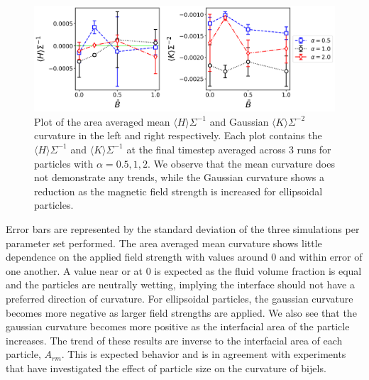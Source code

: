 \begin{figure} 
    \centering 
    \includegraphics[scale = 0.4]{figures/results/paper1/curvature-vs-B_ss.png} 
    \caption{Plot of the area averaged mean $\langle H \rangle \Sigma^{-1}$ and Gaussian 
            $\langle K \rangle \Sigma^{-2}$ curvature in the left and right respectively. Each 
            plot contains the $\langle H \rangle \Sigma^{-1}$ and $\langle K \rangle \Sigma^{-1}$ 
            at the final timestep averaged across 3 runs for particles with $\alpha = 0.5, 1, 2$. 
            We observe that the mean curvature does not demonstrate any trends, while the Gaussian 
            curvature shows a reduction as the magnetic field strength is increased for 
            ellipsoidal particles.} 
    \label{fig:curvature-vs-B_ss}
\end{figure}

Error bars are represented by the standard
deviation of the three simulations per parameter set performed. The area
averaged mean curvature shows little dependence on the applied field
strength with values around 0 and within error of one another. A value
near or at 0 is expected as the fluid volume fraction is equal and the
particles are neutrally wetting, implying the interface should not have
a preferred direction of curvature. \cite{jinnai_interfacial_2001} For
ellipsoidal particles, the gaussian curvature becomes more negative as
larger field strengths are applied. We also see that the gaussian
curvature becomes more positive as the interfacial area of the particle
increases. The trend of these results are inverse to the interfacial
area of each particle, \(A_{rm}\). This is expected behavior and is in
agreement with experiments that have investigated the effect of particle
size on the curvature of bijels. \cite{reeves_quantitative_2016}

